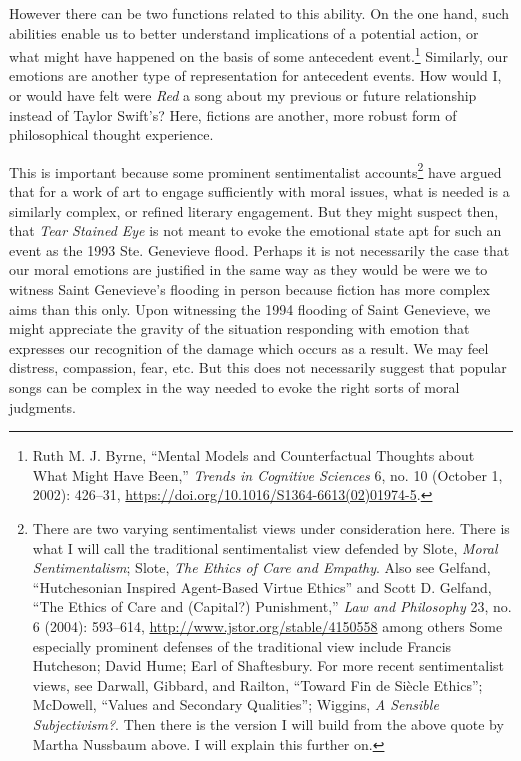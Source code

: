 \documentclass[phdthesis,12pt,final,a4paper]{wuthesis}
\theoremstyle{definition}
\theoremstyle{definition}
\theoremstyle{definition}
\theoremstyle{definition}
\theoremstyle{remark}
\begin{document}
However there can be two functions related to this ability. On the one hand, such abilities enable us to better understand implications of a potential action, or what might have happened on the basis of some antecedent event.\footnote{Ruth M. J. Byrne, {``Mental Models and Counterfactual Thoughts about What Might Have Been,''} \emph{Trends in Cognitive Sciences} 6, no. 10 (October 1, 2002): 426--31, \url{https://doi.org/10.1016/S1364-6613(02)01974-5}.} Similarly, our emotions are another type of representation for antecedent events. How would I, or would have felt were \emph{Red} a song about my previous or future relationship instead of Taylor Swift's? Here, fictions are another, more robust form of philosophical thought experience.

This is important because some prominent sentimentalist accounts\footnote{There are two varying sentimentalist views under consideration here. There is what I will call the traditional sentimentalist view defended by Slote, \emph{Moral {Sentimentalism}}; Slote, \emph{The {Ethics} of {Care} and {Empathy}}. Also see Gelfand, {``Hutchesonian Inspired Agent-Based Virtue Ethics''} and Scott D. Gelfand, {``The {Ethics} of {Care} and ({Capital}?) {Punishment},''} \emph{Law and Philosophy} 23, no. 6 (2004): 593--614, \url{http://www.jstor.org/stable/4150558} among others Some especially prominent defenses of the traditional view include Francis Hutcheson; David Hume; Earl of Shaftesbury. For more recent sentimentalist views, see Darwall, Gibbard, and Railton, {``Toward Fin de Siècle Ethics''}; McDowell, {``Values and {Secondary Qualities}''}; Wiggins, \emph{A {Sensible Subjectivism}?}. Then there is the version I will build from the above quote by Martha Nussbaum above. I will explain this further on.} have argued that for a work of art to engage sufficiently with moral issues, what is needed is a similarly complex, or refined literary engagement. But they might suspect then, that \emph{Tear Stained Eye} is not meant to evoke the emotional state apt for such an event as the 1993 Ste. Genevieve flood. Perhaps it is not necessarily the case that our moral emotions are justified in the same way as they would be were we to witness Saint Genevieve's flooding in person because fiction has more complex aims than this only. Upon witnessing the 1994 flooding of Saint Genevieve, we might appreciate the gravity of the situation responding with emotion that expresses our recognition of the damage which occurs as a result. We may feel distress, compassion, fear, etc. But this does not necessarily suggest that popular songs can be complex in the way needed to evoke the right sorts of moral judgments.
\end{document}
